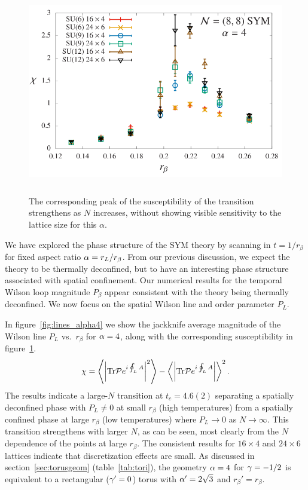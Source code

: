 \begin{figure}[tbp]
  \centering
  \includegraphics[height=9cm]{Figures/sus_alpha4.pdf}
  \caption{\label{fig:sus_alpha4} The corresponding peak of the susceptibility of the transition strengthens as $N$ increases, without showing visible sensitivity to the lattice size for this $\alpha$. }
\end{figure}

We have explored the phase structure of the SYM theory by scanning in $t = 1 / r_{\beta}$ for fixed aspect ratio $\alpha = r_L / r_{\beta}$.
From our previous discussion, we expect the theory to be thermally deconfined, but to have an interesting phase structure associated with spatial confinement.
Our numerical results for the temporal Wilson loop magnitude $P_{\beta}$ appear consistent with the theory being thermally deconfined.
We now focus on the spatial Wilson line and order parameter $P_L$.

In figure~\ref{fig:lines_alpha4} we show the jackknife average magnitude of the Wilson line $P_L$ vs.~$r_{\beta}$ for $\alpha = 4$, along with the corresponding susceptibility in figure~\ref{fig:sus_alpha4}. 
\begin{equation}
  \chi = \left\langle \left| \mathrm{Tr}{\mathcal P e^{i\oint_L A}} \right|^2 \right\rangle - \left\langle \left| \mathrm{Tr}{\mathcal P e^{i\oint_L A}} \right| \right\rangle^2.
\end{equation}
The results indicate a large-$N$ transition at $t_c = 4.6(2)$ separating a spatially deconfined phase with $P_L \ne 0$ at small $r_{\beta}$ (high temperatures) from a spatially confined phase at large $r_{\beta}$ (low temperatures) where $P_L \to 0$ as $N \to \infty$.
This transition strengthens with larger $N$, as can be seen, most clearly from the $N$ dependence of the points at large $r_{\beta}$.
The consistent results for $16\times 4$ and $24\times 6$ lattices indicate that discretization effects are small.
As discussed in section~\ref{sec:torusgeom} (table~\ref{tab:tori}), the geometry $\alpha = 4$ for $\gamma = -1 / 2$ is equivalent to a rectangular ($\gamma' = 0$) torus with $\alpha' = 2\sqrt{3}$ and $r_{\beta}' = r_{\beta}$.

